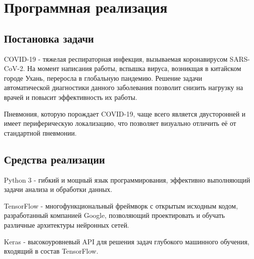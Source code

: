 \section{Программная реализация}

\subsection{Постановка задачи}

COVID-19 - тяжелая респираторная инфекция, вызываемая коронавирусом SARS-CoV-2. На момент написания работы, вспышка вируса, возникщая в китайском городе Ухань, переросла в глобальную пандемию. Решение задачи автоматической диагностики данного заболевания позволит снизить нагрузку на врачей и повысит эффективность их работы.

Пневмония, которую порождает COVID-19, чаще всего является двусторонней и имеет периферическую локализацию, что позволяет визуально отличить её от стандартной пневмонии.



\subsection{Средства реализации}
Python 3 - гибкий и мощный язык программирования, эффективно выполняющий задачи анализа и обработки данных.

TensorFlow - многофункциональный фреймворк с открытым исходным кодом, разработанный компанией Google, позволяющий проектировать и обучать различные архитектуры нейронных сетей.

Keras - высокоуровневый API для решения задач глубокого машинного обучения, входящий в состав TensorFlow.

